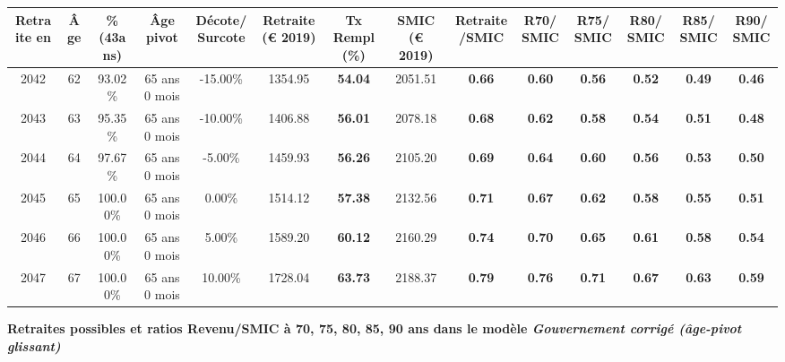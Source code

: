 \begin{adjustbox}{max width=\textwidth} 
\begin{tabular}[htb]{|c|c||c|c|c||c|c||c|c||c|c|c|c|c|} 
\hline 
 Retraite en &  Âge &  \%(43ans) &  Âge pivot &  Décote/Surcote &  Retraite (\euro{} 2019) &  Tx Rempl(\%) &  SMIC (\euro{} 2019) &  Retraite/SMIC &  R70/SMIC &  R75/SMIC &  R80/SMIC &  R85/SMIC &  R90/SMIC \\ 
\hline \hline 
 2042 &  62 &  93.02\% &  65 ans 0 mois &  -15.00\% &  1354.95 &  {\bf 54.04} &  2051.51 &  {\bf {\color{red} 0.66}} &  {\bf {\color{red} 0.60}} &  {\bf {\color{red} 0.56}} &  {\bf {\color{red} 0.52}} &  {\bf {\color{red} 0.49}} &  {\bf {\color{red} 0.46}} \\ 
\hline 
 2043 &  63 &  95.35\% &  65 ans 0 mois &  -10.00\% &  1406.88 &  {\bf 56.01} &  2078.18 &  {\bf {\color{red} 0.68}} &  {\bf {\color{red} 0.62}} &  {\bf {\color{red} 0.58}} &  {\bf {\color{red} 0.54}} &  {\bf {\color{red} 0.51}} &  {\bf {\color{red} 0.48}} \\ 
\hline 
 2044 &  64 &  97.67\% &  65 ans 0 mois &  -5.00\% &  1459.93 &  {\bf 56.26} &  2105.20 &  {\bf {\color{red} 0.69}} &  {\bf {\color{red} 0.64}} &  {\bf {\color{red} 0.60}} &  {\bf {\color{red} 0.56}} &  {\bf {\color{red} 0.53}} &  {\bf {\color{red} 0.50}} \\ 
\hline 
 2045 &  65 &  100.00\% &  65 ans 0 mois &  0.00\% &  1514.12 &  {\bf 57.38} &  2132.56 &  {\bf {\color{red} 0.71}} &  {\bf {\color{red} 0.67}} &  {\bf {\color{red} 0.62}} &  {\bf {\color{red} 0.58}} &  {\bf {\color{red} 0.55}} &  {\bf {\color{red} 0.51}} \\ 
\hline 
 2046 &  66 &  100.00\% &  65 ans 0 mois &  5.00\% &  1589.20 &  {\bf 60.12} &  2160.29 &  {\bf {\color{red} 0.74}} &  {\bf {\color{red} 0.70}} &  {\bf {\color{red} 0.65}} &  {\bf {\color{red} 0.61}} &  {\bf {\color{red} 0.58}} &  {\bf {\color{red} 0.54}} \\ 
\hline 
 2047 &  67 &  100.00\% &  65 ans 0 mois &  10.00\% &  1728.04 &  {\bf 63.73} &  2188.37 &  {\bf {\color{red} 0.79}} &  {\bf {\color{red} 0.76}} &  {\bf {\color{red} 0.71}} &  {\bf {\color{red} 0.67}} &  {\bf {\color{red} 0.63}} &  {\bf {\color{red} 0.59}} \\ 
\hline 
\hline 
\end{tabular} 
\end{adjustbox} 
 
 \vspace{0.1cm} 
{\bf \noindent Retraites possibles et ratios Revenu/SMIC à 70, 75, 80, 85, 90 ans dans le modèle \emph{Gouvernement corrigé (âge-pivot glissant)}}  
 
